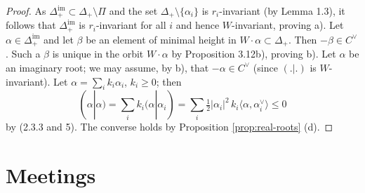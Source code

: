 \documentclass[12pt]{article}
\begin{document}
\begin{proof}
As $\Delta^{\mathrm{im}}_+ \subset \Delta_+ \setminus \Pi$ and the set 
$\Delta_+\setminus\{\alpha_i\}$ is $r_i$-invariant (by Lemma 1.3), it follows 
that $\Delta^{\mathrm{im}}_+$ is $r_i$-invariant for all $i$ and hence 
$W$-invariant, proving a). Let $\alpha \in \Delta^{\mathrm{im}}_+$ and let $\beta$ 
be an element of minimal height in $W\cdot\alpha \subset \Delta_+$. Then $-\beta 
\in C^\vee$. Such a $\beta$ is unique in the orbit $W\cdot\alpha$ by Proposition 
3.12b), proving b). Let $\alpha$ be an imaginary root; we may assume, by b), that 
$-\alpha \in C^\vee$ (since $(.|.)$ is $W$-invariant). Let 
$\alpha = \sum_i k_i \alpha_i$, $k_i \geq 0$; then
\[
   (\alpha|\alpha) = \sum_i k_i (\alpha|\alpha_i) 
   = \sum_i \tfrac{1}{2}|\alpha_i|^2\, k_i \langle \alpha, \alpha_i^\vee \rangle 
   \leq 0
\]
by (2.3.3 and 5). The converse holds by Proposition \ref{prop:real-roots} (d).
\end{proof}

\section{Meetings}
\end{document}

